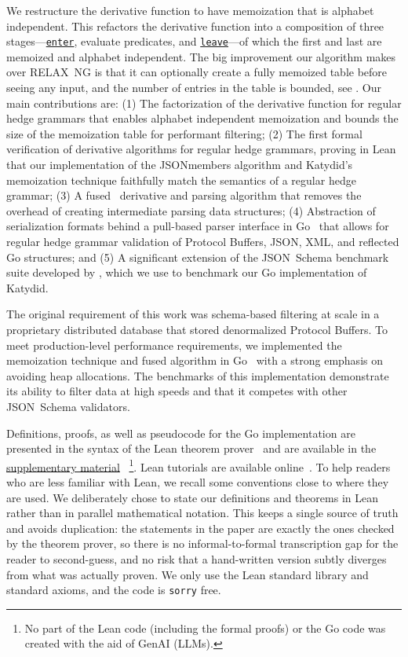 \documentclass[acmsmall,%
  screen,%
  authorversion, %
  nonacm%
]{acmart}
\newcommand{\link}[2]{\mbox{\hyperref[#2]{\lstinline{#1}}}\xspace}
\newcommand{\enter}{\link{enter}{def enter}}
\newcommand{\leave}{\link{leave}{def leave}}
\newcommand{\RelaxNG}{%
  RELAX~NG\xspace%
}
\newcommand{\JSONSchema}{%
  JSON~Schema\xspace%
}
\newcommand{\supplementarymaterial}{%
  \hyperref[supplementary_material]{supplementary material}\xspace%
}
\newcommand{\JSON}{\ac{JSON}\xspace}
\newcommand{\XML}{\ac{XML}\xspace}
\begin{document}
We restructure the derivative function to have memoization that is alphabet independent.
This refactors the derivative function into a composition of three stages—\enter, evaluate predicates, and \leave—of which the first and last are memoized and alphabet independent.
The big improvement our algorithm makes over \RelaxNG is that it can optionally create a fully memoized table before seeing any input, and the number of entries in the table is bounded, see .
Our main contributions are:
(1) The factorization of the derivative function for regular hedge grammars that enables alphabet independent memoization and bounds the size of the memoization table for performant filtering;
(2) The first formal verification of derivative algorithms for regular hedge grammars, proving in Lean~\cite{lean4} that our implementation of the JSONmembers algorithm and Katydid's memoization technique faithfully match the semantics of a regular hedge grammar;
(3) A fused~\cite{fusion} derivative and parsing algorithm that removes the overhead of creating intermediate parsing data structures;
(4) Abstraction of serialization formats behind a pull-based parser interface in Go~\cite{golang} that allows for regular hedge grammar validation of Protocol Buffers, \JSON, \XML, and reflected Go structures; and
(5) A significant extension of the \JSONSchema benchmark suite developed by \citet{blaze}, which we use to benchmark our Go implementation of Katydid.

The original requirement of this work was schema-based filtering at scale in a proprietary distributed database that stored denormalized Protocol Buffers.
To meet production-level performance requirements, we implemented the memoization technique and fused algorithm in Go~\cite{golang} with a strong emphasis on avoiding heap allocations.
The benchmarks of this implementation demonstrate its ability to filter data at high speeds and that it competes with other \JSONSchema validators.

Definitions, proofs, as well as pseudocode for the Go implementation are presented in the syntax of the Lean theorem prover~\cite{lean4} and are available in the \supplementarymaterial~\footnote{No part of the Lean code (including the formal proofs) or the Go code was created with the aid of GenAI (LLMs).}.
Lean tutorials are available online~\cite{learnlean}.
To help readers who are less familiar with Lean, we recall some conventions close to where they are used.
We deliberately chose to state our definitions and theorems in Lean rather than in parallel mathematical notation.
This keeps a single source of truth and avoids duplication: the statements in the paper are exactly the ones checked by the theorem prover, so there is no informal-to-formal transcription gap for the reader to second-guess, and no risk that a hand-written version subtly diverges from what was actually proven.
We only use the Lean standard library and standard axioms, and the code is \lstinline{sorry} free.
\end{document}
